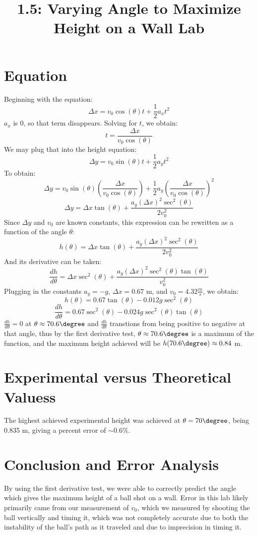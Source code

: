 \documentclass{article}
\title{1.5: Varying Angle to Maximize Height on a Wall Lab}
\begin{document}
\section{Equation}
Beginning with the equation:
\[\Delta x = v_0\cos(\theta)t + \frac{1}{2}a_xt^2\]
$a_x$ is 0, so that term disappears. Solving for $t$, we obtain:
\[t = \frac{\Delta x}{v_0\cos(\theta)}\]
We may plug that into the height equation:
\[\Delta y = v_0\sin(\theta)t + \frac{1}{2}a_yt^2\]
To obtain:
\[\Delta y = v_0\sin(\theta)(\frac{\Delta x}{v_0\cos(\theta)}) + \frac{1}{2}a_y(\frac{\Delta x}{v_0\cos(\theta)})^2\]
\[\Delta y = \Delta x\tan(\theta) + \frac{a_y(\Delta x)^2\sec^2(\theta)}{2v_0^2}\]
Since $\Delta y$ and $v_0$ are known constants, this expression can be rewritten as a function of the angle $\theta$:
\[h(\theta) = \Delta x\tan(\theta) + \frac{a_y(\Delta x)^2\sec^2(\theta)}{2v_0^2}\]
And its derivative can be taken:
\[\frac{dh}{d\theta} = \Delta x\sec^2(\theta) + \frac{a_y(\Delta x)^2\sec^2(\theta)\tan(\theta)}{v_0^2}\]
Plugging in the constants $a_y = -g$, $\Delta x = 0.67$ m, and $v_0 = 4.32 \frac{m}{s}$, we obtain:
\[h(\theta) = 0.67\tan(\theta) - 0.012g\sec^2(\theta)\]
\[\frac{dh}{d\theta} = 0.67\sec^2(\theta) - 0.024g\sec^2(\theta)\tan(\theta)\]
$\frac{dh}{d\theta} = 0$ at $\theta \approx 70.6\degree$ and $\frac{dh}{d\theta}$ transtions from being positive to negative at that angle, thus by the first derivative test, $\theta \approx 70.6\degree$ is a maximum of the function, and the maximum height achieved will be $h(70.6\degree) \approx 0.84$ m.
\section{Experimental versus Theoretical Valuess}
The highest achieved experimental height was achieved at $\theta = 70\degree$, being 0.835 m, giving a percent error of $\sim0.6\%$.
\section{Conclusion and Error Analysis}
By using the first derivative test, we were able to correctly predict the angle which gives the maximum height of a ball shot on a wall. Error in this lab likely primarily came from our measurement of $v_0$, which we measured by shooting the ball vertically and timing it, which was not completely accurate due to both the instability of the ball's path as it traveled and due to imprecision in timing it.
\end{document}
